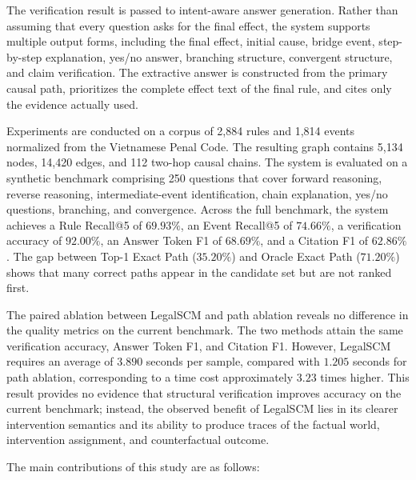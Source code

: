 The verification result is passed to intent-aware answer generation. Rather
than assuming that every question asks for the final effect, the system
supports multiple output forms, including the final effect, initial cause,
bridge event, step-by-step explanation, yes/no answer, branching structure,
convergent structure, and claim verification. The extractive answer is
constructed from the primary causal path, prioritizes the complete effect
text of the final rule, and cites only the evidence actually used.

Experiments are conducted on a corpus of 2,884 rules and 1,814 events
normalized from the Vietnamese Penal Code. The resulting graph contains
5,134 nodes, 14,420 edges, and 112 two-hop causal chains. The system is
evaluated on a synthetic benchmark comprising 250 questions that cover
forward reasoning, reverse reasoning, intermediate-event identification,
chain explanation, yes/no questions, branching, and convergence. Across the
full benchmark, the system achieves a Rule Recall@5 of \(69.93\%\), an Event
Recall@5 of \(74.66\%\), a verification accuracy of \(92.00\%\), an Answer
Token F1 of \(68.69\%\), and a Citation F1 of \(62.86\%\). The gap between
Top-1 Exact Path (\(35.20\%\)) and Oracle Exact Path (\(71.20\%\)) shows that
many correct paths appear in the candidate set but are not ranked first.

The paired ablation between LegalSCM and path ablation reveals no difference
in the quality metrics on the current benchmark. The two methods attain the
same verification accuracy, Answer Token F1, and Citation F1. However,
LegalSCM requires an average of \(3.890\) seconds per sample, compared with
\(1.205\) seconds for path ablation, corresponding to a time cost
approximately \(3.23\) times higher. This result provides no evidence that
structural verification improves accuracy on the current benchmark;
instead, the observed benefit of LegalSCM lies in its clearer intervention
semantics and its ability to produce traces of the factual world,
intervention assignment, and counterfactual outcome.

The main contributions of this study are as follows:

